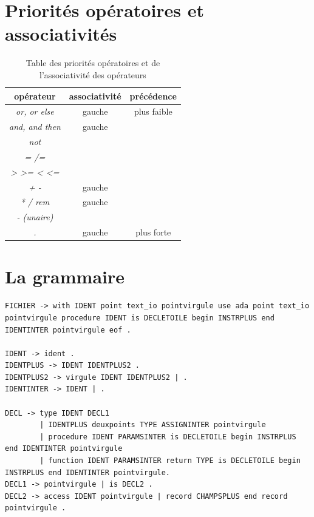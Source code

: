 \documentclass[11pt]{article}
\begin{document}
\begin{appendix}

\section{Priorités opératoires et associativités}
\label{tab:priorities}

    \begin{table}[h]
        \centering
        \begin{tabular}{|c|c|c|}
            \hline
            opérateur & associativité & précédence \\
            \hline
            \textit{or, or else} & gauche & plus faible \\
            \hline
            \textit{and, and then} & gauche & \\
            \hline
            \textit{not} & & \\
            \hline
            \textit{= /=} & & \\
            \hline
            \textit{> >= < <=} & & \\
            \hline
            \textit{+ -} & gauche & \\
            \hline
            \textit{* / rem} & gauche & \\
            \hline 
            \textit{- (unaire)} & & \\
            \hline
            \textit{.} & gauche & plus forte \\
            \hline
        \end{tabular}
        \caption{Table des priorités opératoires et de l'associativité des opérateurs}
    \end{table}



\section{La grammaire}\label{Grammaire}

\begin{lstlisting}[caption={La grammaire que nous avons obtenue}]
FICHIER -> with IDENT point text_io pointvirgule use ada point text_io pointvirgule procedure IDENT is DECLETOILE begin INSTRPLUS end IDENTINTER pointvirgule eof .

IDENT -> ident .
IDENTPLUS -> IDENT IDENTPLUS2 .
IDENTPLUS2 -> virgule IDENT IDENTPLUS2 | .
IDENTINTER -> IDENT | . 

DECL -> type IDENT DECL1 
        | IDENTPLUS deuxpoints TYPE ASSIGNINTER pointvirgule 
        | procedure IDENT PARAMSINTER is DECLETOILE begin INSTRPLUS end IDENTINTER pointvirgule
        | function IDENT PARAMSINTER return TYPE is DECLETOILE begin INSTRPLUS end IDENTINTER pointvirgule.
DECL1 -> pointvirgule | is DECL2 .
DECL2 -> access IDENT pointvirgule | record CHAMPSPLUS end record pointvirgule .


\end{lstlisting}
\end{appendix}
\end{document}
